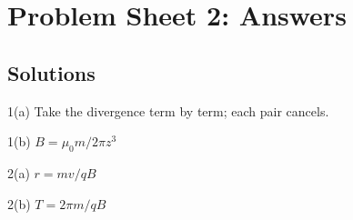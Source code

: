 \documentclass[12pt]{article}
\begin{document}
\section*{Problem Sheet 2: Answers}

\subsection*{Solutions}

1(a) Take the divergence term by term; each pair cancels.

1(b) $B = \mu_0 m / 2\pi z^3$

2(a) $r = mv / qB$

2(b) $T = 2\pi m / qB$
\end{document}
